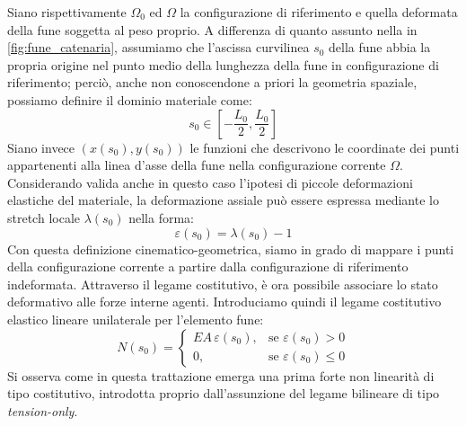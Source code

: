 \vspace{1em}
Siano rispettivamente $\Omega_0$ ed $\Omega$ la configurazione di riferimento e quella deformata della fune soggetta al peso proprio. A differenza di quanto assunto nella in \cref{fig:fune_catenaria}, assumiamo che l'ascissa curvilinea $s_0$ della fune abbia la propria origine nel punto medio della lunghezza della fune in configurazione di riferimento; perciò, anche non conoscendone a priori la geometria spaziale, possiamo definire il dominio materiale come:
\begin{equation}
   s_0 \in \left[ -\frac{L_0}{2}, \frac{L_0}{2}\right]
   \label{eq:dominio_s0}
\end{equation}
Siano invece $(x(s_0), y(s_0))$ le funzioni che descrivono le coordinate dei punti appartenenti alla linea d'asse della fune nella configurazione corrente $\Omega$. Considerando valida anche in questo caso l'ipotesi di piccole deformazioni elastiche del materiale, la deformazione assiale può essere espressa mediante lo stretch locale $\lambda(s_0)$ nella forma:
\begin{equation}
   \varepsilon(s_0) = \lambda(s_0) - 1 
   \label{eq:deformazione_assiale2}
\end{equation}
Con questa definizione cinematico-geometrica, siamo in grado di mappare i punti della configurazione corrente a partire dalla configurazione di riferimento indeformata. Attraverso il legame costitutivo, è ora possibile associare lo stato deformativo alle forze interne agenti. Introduciamo quindi il legame costitutivo elastico lineare unilaterale per l'elemento fune:
\begin{equation}
N(s_0) =
\begin{cases}
EA \, \varepsilon(s_0), & \text{se } \varepsilon(s_0) > 0 \\[6pt]
0, & \text{se } \varepsilon(s_0) \le 0
\end{cases}
\label{eq:tension_only}
\end{equation}
Si osserva come in questa trattazione emerga una prima forte non linearità di tipo costitutivo, introdotta proprio dall'assunzione del legame bilineare di tipo \textit{tension-only}.

